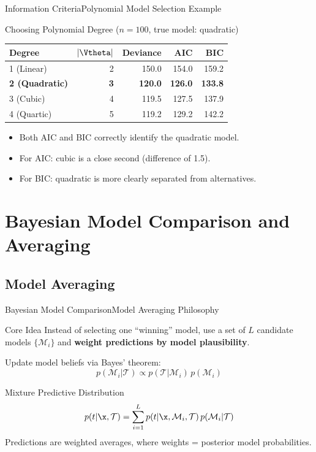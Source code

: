 \begin{frame}{Information Criteria}{Polynomial Model Selection Example}
  \begin{exampleblock}{Choosing Polynomial Degree ($n=100$, true model: quadratic)}
    \begin{center}
    \begin{tabular}{lrrrr}
      \toprule
      \textbf{Degree} & $|\Vtheta|$ & \textbf{Deviance} & \textbf{AIC} & \textbf{BIC}\\
      \midrule
      1 (Linear)           & 2 & 150.0 & 154.0 & 159.2\\
      \textbf{2 (Quadratic)} & \textbf{3} & \textbf{120.0} & \textbf{126.0} & \textbf{133.8}\\
      3 (Cubic)            & 4 & 119.5 & 127.5 & 137.9\\
      4 (Quartic)          & 5 & 119.2 & 129.2 & 142.2\\
      \bottomrule
    \end{tabular}
    \end{center}
    \begin{itemize}
      \item Both AIC and BIC correctly identify the quadratic model.
      \item For AIC: cubic is a close second (difference of 1.5).
      \item For BIC: quadratic is more clearly separated from alternatives.
    \end{itemize}
  \end{exampleblock}
\end{frame}

\section{Bayesian Model Comparison and Averaging}

\subsection{Model Averaging}

\begin{frame}{Bayesian Model Comparison}{Model Averaging Philosophy}
  \begin{block}{Core Idea}
    Instead of selecting one ``winning'' model, use a set of $L$ candidate models $\{\mathcal{M}_i\}$ and \textbf{weight predictions by model plausibility}.
  \end{block}

  Update model beliefs via Bayes' theorem:
  \[
    p(\mathcal{M}_i|\mathcal{T}) \propto p(\mathcal{T}|\mathcal{M}_i)\,p(\mathcal{M}_i)
  \]

  \begin{block}{Mixture Predictive Distribution}
    \[
      p(t|\x,\mathcal{T}) = \sum_{i=1}^L p(t|\x,\mathcal{M}_i,\mathcal{T})\,p(\mathcal{M}_i|\mathcal{T})
    \]
    Predictions are weighted averages, where weights = posterior model probabilities.
  \end{block}
\end{frame}

